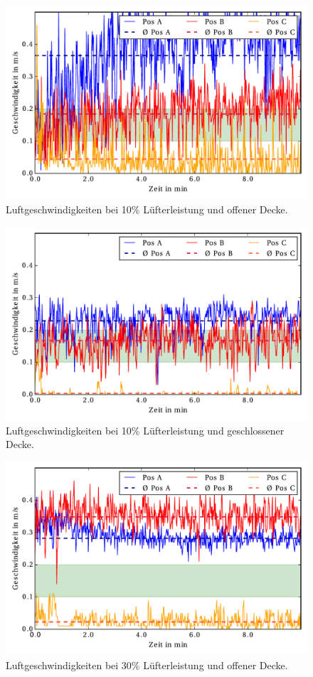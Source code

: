 \begin{figure}[h!tb]
\centering
\includegraphics[scale=.8]{Pictures/AV10pctOC1.pdf}
\caption{Luftgeschwindigkeiten bei 10\% Lüfterleistung und offener Decke.}
\label{fig:10pctOC}
\end{figure}


\begin{figure}[h!tb]
\centering
\includegraphics[scale=.8]{Pictures/AV10pctCC1.pdf}
\caption{Luftgeschwindigkeiten bei 10\% Lüfterleistung und geschlossener Decke.}
\label{fig:10pctCC}
\end{figure}


\begin{figure}[h!tb]
\centering
\includegraphics[scale=.8]{Pictures/AV30pctOC1.pdf}
\caption{Luftgeschwindigkeiten bei 30\% Lüfterleistung und offener Decke.}
\label{fig:30pctOC}
\end{figure}


